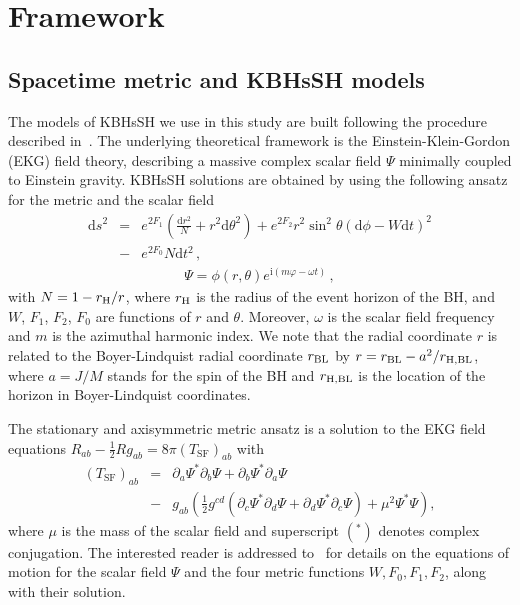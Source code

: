 \documentclass[twocolumn,aps,showpacs,showkeys,prd,superscriptaddress,byrevtex, amsmath]{revtex4-1}
\begin{document}
\section{Framework}
\label{framework}

\subsection{Spacetime metric and KBHsSH models}

The models of KBHsSH we use in this study are built following the procedure described in~\cite{Herdeiro:2015b}. The underlying theoretical framework is the Einstein-Klein-Gordon (EKG) field theory, describing a massive complex scalar field $\Psi$ minimally coupled to Einstein gravity. KBHsSH solutions are obtained by using the following ansatz for the metric and the scalar field~\cite{Herdeiro:2014a}
\begin{eqnarray}
\mathrm{d}s^2 &=& e^{2F_1}\left(\frac{\mathrm{d}r^2}{N} + r^2\mathrm{d}\theta^2\right) +  e^{2F_2}r^2\sin^2 \theta(\mathrm{d}\phi-W\mathrm{d}t)^2 
\nonumber \\ 
&-&  e^{2F_0}N\mathrm{d}t^2\,,
\label{metric}
\end{eqnarray}
\begin{eqnarray}
\Psi = \phi(r, \theta) e^{\mathrm{i}(m\varphi - \omega t)} \,,
\end{eqnarray}
with $N = 1 - r_{\rm H}/r$, where $r_{\rm H}$ is the radius of the event horizon of the BH, and $W$, $F_1$, $F_2$, $F_0$ are functions of $r$ and $\theta$. Moreover, $\omega$ is the scalar field frequency and $m$ is the azimuthal harmonic index.
We note that the radial coordinate $r$ is related to the Boyer-Lindquist radial coordinate $r_{\rm BL}$ by $r=r_{\rm BL}-a^2/r_{\rm H,BL}$, where $a = J/M$ stands for the spin of the BH and $r_{\rm H,BL}$ is the location of the horizon in Boyer-Lindquist coordinates.

The stationary and axisymmetric metric ansatz is a solution to the EKG field equations $R_{ab} - \frac{1}{2}R g _{ab} = 8 \pi (T_{\mathrm{SF}})_{ab}$ with 
\begin{eqnarray}\label{eq:e-m_scalaf_field}
(T_{\mathrm{SF}})_{ab} &=& \partial_a \Psi^* \partial_b \Psi + \partial_b \Psi^* \partial_a \Psi 
\nonumber \\ 
&-& g_{ab} \left(\frac{1}{2} g^{cd}(\partial_c \Psi^* \partial_d \Psi + \partial_d \Psi^* \partial_c \Psi) + \mu^2 \Psi^* \Psi \right),
\end{eqnarray}
where $\mu$ is the mass of the scalar field and superscript $(^*)$ denotes complex conjugation. The interested reader is addressed to~\cite{Herdeiro:2015b} for details on the equations of motion for the scalar field $\Psi$ and the four metric functions ${W, F_0,F_1,F_2}$, along with their solution.
\end{document}
